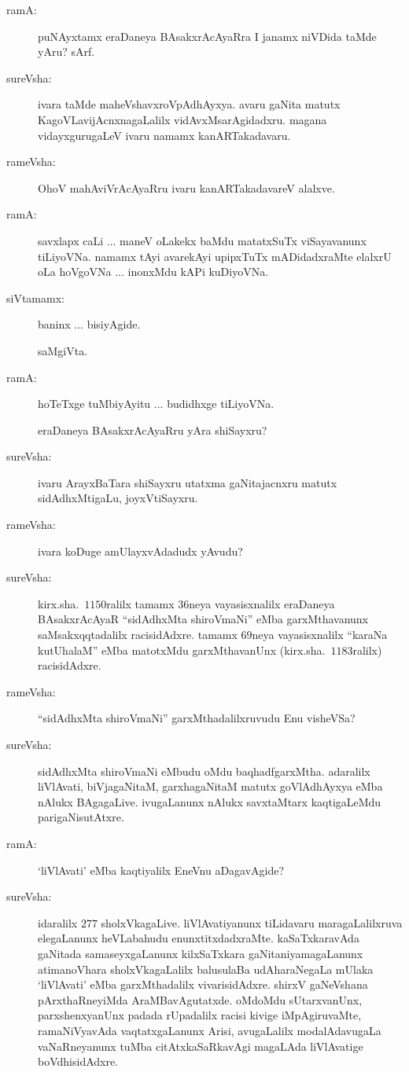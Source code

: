 \begin{description}
\item[ramA:] puNAyxtamx eraDaneya BAsakxrAcAyaRra I janamx niVDida taMde yAru? sArf.

\item[sureVsha:] ivara taMde maheVshavxroVpAdhAyxya. avaru gaNita matutx KagoVLa\-vijAcnxnagaLalilx vidAvxMsarAgidadxru. magana vidayxgurugaLeV ivaru namamx kanARTakadavaru.

\item[rameVsha:] OhoV mahAviVrAcAyaRru ivaru kanARTakadavareV alalxve.

\item[ramA:] savxlapx caLi ... maneV oLakekx baMdu matatxSuTx viSayavanunx tiLiyoVNa. namamx tAyi avarekAyi upipxTuTx mADidadxraMte elalxrU oLa hoVgoVNa ... inonxMdu kAPi kuDiyoVNa.

\item[siVtamamx:] baninx ... bisiyAgide.

saMgiVta.

\item[ramA:] hoTeTxge tuMbiyAyitu ... budidhxge tiLiyoVNa.

eraDaneya BAsakxrAcAyaRru yAra shiSayxru?

\item[sureVsha:] ivaru ArayxBaTara shiSayxru utatxma gaNitajacnxru matutx sidAdhxMtigaLu, joyxVtiSayxru.

\item[rameVsha:] ivara koDuge amUlayxvAdadudx yAvudu?

\item[sureVsha:] kirx.sha.\ $1150$ralilx tamamx $36$neya vayasisxnalilx eraDaneya BAsakxrAcAyaR ``sidAdhxMta shiroVmaNi'' eMba garxMthavanunx saMsakxqqtadalilx racisidAdxre. tamamx $69$neya vayasisxnalilx ``karaNa kutUhalaM'' eMba matotxMdu garxMthavanUnx (kirx.sha.\ $1183$ralilx) racisidAdxre.

\item[rameVsha:] ``sidAdhxMta shiroVmaNi'' garxMthadalilxruvudu Enu visheVSa?

\item[sureVsha:] sidAdhxMta shiroVmaNi eMbudu oMdu baqhadfgarxMtha. adaralilx liVlAvati, biVjagaNitaM, garxhagaNitaM matutx goVlAdhAyxya eMba nAlukx BAgagaLive. ivugaLanunx nAlukx savxtaMtarx kaqtigaLeMdu parigaNisutAtxre.

\item[ramA:] `liVlAvati' eMba kaqtiyalilx EneVnu aDagavAgide?

\item[sureVsha:] idaralilx $277$ sholxVkagaLive. liVlAvatiyanunx tiLidavaru maragaLalilxruva elegaLanunx heVLabahudu enunxtitxdadxraMte. kaSaTxkaravAda gaNitada samaseyx\break gaLanunx kilxSaTxkara gaNitaniyamagaLanunx atimanoVhara sholxVkagaLalilx balu\break sulaBa udAharaNegaLa mUlaka `liVlAvati' eMba garxMthadalilx vivarisidAdxre. shirxV gaNeVshana pArxthaRneyiMda AraMBavAgutatxde. oMdoMdu sUtarxvanUnx,\- parxshenxyanUnx padada rUpadalilx racisi kivige iMpAgiruvaMte, ramaNiVya\-vAda vaqtatxgaLanunx Arisi, avugaLalilx modalAdavugaLa vaNaRneyanunx tuMba citAtxkaSaRkavAgi magaLAda liVlAvatige boVdhisidAdxre.


\end{description}
